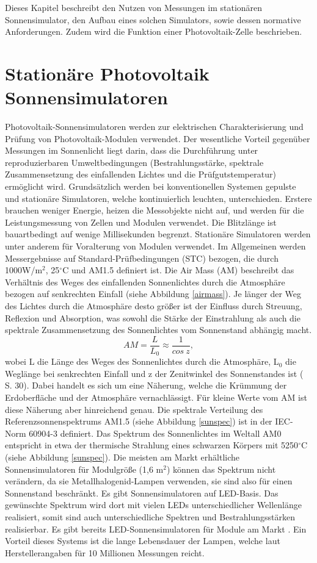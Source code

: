 \documentclass[a4paper,bibtotoc,oneside]{scrbook}
\begin{document}
Dieses Kapitel beschreibt den Nutzen von Messungen im stationären Sonnensimulator, den Aufbau eines solchen Simulators, sowie dessen normative Anforderungen. Zudem wird die Funktion einer Photovoltaik-Zelle beschrieben.

\section{Stationäre Photovoltaik Sonnensimulatoren} \thispagestyle{empty}

Photovoltaik-Sonnensimulatoren werden zur elektrischen Charakterisierung und Prüfung von Photovoltaik-Modulen verwendet. Der wesentliche Vorteil gegenüber Messungen im Sonnenlicht liegt darin, dass die Durchführung unter reproduzierbaren Umweltbedingungen (Bestrahlungsstärke, spektrale Zusammensetzung des einfallenden Lichtes und die Prüfgutstemperatur)  ermöglicht wird. Grundsätzlich werden bei konventionellen Systemen gepulste und stationäre Simulatoren, welche kontinuierlich leuchten, unterschieden. Erstere brauchen weniger Energie, heizen die Messobjekte nicht auf, und werden für die Leistungsmessung von Zellen und Modulen verwendet. Die Blitzlänge ist bauartbedingt auf wenige Millisekunden begrenzt. Stationäre Simulatoren werden unter anderem für Voralterung von Modulen verwendet.
Im Allgemeinen werden Messergebnisse auf Standard-Prüfbedingungen (STC) bezogen, die durch 1000W/m$^2$, 25$^{\circ}$C und AM1.5 definiert ist. Die Air Mass (AM) beschreibt das Verhältnis des Weges des einfallenden Sonnenlichtes durch die Atmosphäre bezogen auf senkrechten Einfall (siehe Abbildung \ref{airmass}). Je länger der Weg des Lichtes durch die Atmosphäre desto größer ist der Einfluss durch Streuung, Reflexion und Absorption, was sowohl die Stärke der Einstrahlung als auch die spektrale Zusammensetzung des Sonnenlichtes vom Sonnenstand abhängig macht. 
\begin{equation}
     AM = \frac {L} {L_0} \approx \frac{1}{cos~ z},
\end{equation}
wobei L die Länge des Weges des Sonnenlichtes durch die Atmosphäre, L$_0$ die Weglänge bei senkrechten Einfall und z der Zenitwinkel des Sonnenstandes ist (\cite{wurf} S. 30). Dabei handelt es sich um eine Näherung, welche die Krümmung der Erdoberfläche und der Atmosphäre vernachlässigt. Für kleine Werte vom AM ist diese Näherung aber hinreichend genau.
Die spektrale Verteilung des Referenzsonnenspektrums AM1.5 (siehe Abbildung \ref{sunspec}) ist in der IEC-Norm 60904-3 \cite{norm3} definiert. Das Spektrum des Sonnenlichtes im Weltall AM0 entspricht in etwa der thermische Strahlung eines schwarzen Körpers mit 5250$^\circ$C (siehe Abbildung \ref{sunspec}).
Die meisten am Markt erhältliche Sonnensimulatoren für Modulgröße (1,6 m$^2$) können das Spektrum nicht verändern, da sie Metallhalogenid-Lampen verwenden, sie sind also für einen Sonnenstand beschränkt. Es gibt Sonnensimulatoren auf LED-Basis. Das gewünschte Spektrum wird dort mit vielen LEDs unterschiedlicher Wellenlänge realisiert, somit sind auch unterschiedliche Spektren und Bestrahlungsstärken realisierbar. Es gibt bereits LED-Sonnensimulatoren für Module am Markt \cite{mps}. Ein Vorteil dieses Systems ist die lange Lebensdauer der Lampen, welche laut Herstellerangaben für 10 Millionen Messungen reicht. 
\end{document}

